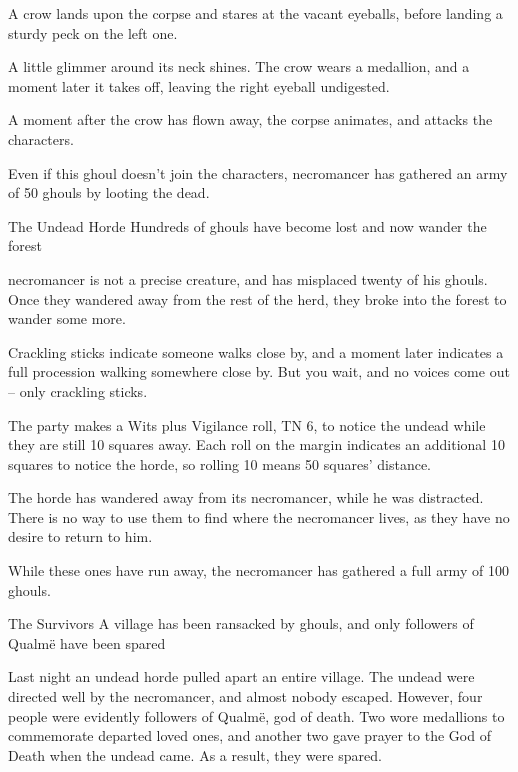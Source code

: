 \begin{multicols}{2}
\begin{boxtext}
	A crow lands upon the corpse and stares at the vacant eyeballs, before landing a sturdy peck on the left one.

	A little glimmer around its neck shines.  The crow wears a medallion, and a moment later it takes off, leaving the right eyeball undigested.

\end{boxtext}

A moment after the crow has flown away, the corpse animates, and attacks the characters.


Even if this ghoul doesn't join the characters, \gls{necromancer} has gathered an army of 50 ghouls by looting the dead.

{The Undead Horde}%
{Hundreds of ghouls have become lost and now wander the forest}%

\Gls{necromancer} is not a precise creature, and has misplaced twenty of his ghouls.
Once they wandered away from the rest of the herd, they broke into the forest to wander some more.

\begin{boxtext}

	Crackling sticks indicate someone walks close by, and a moment later indicates a full procession walking somewhere close by.
	But you wait, and no voices come out -- only crackling sticks.

\end{boxtext}

The party makes a Wits plus Vigilance roll, TN 6, to notice the undead while they are still 10 squares away.
Each roll on the margin indicates an additional 10 squares to notice the horde, so rolling 10 means 50 squares' distance.

The horde has wandered away from its necromancer, while he was distracted.
There is no way to use them to find where the necromancer lives, as they have no desire to return to him.

While these ones have run away, the necromancer has gathered a full army of 100 ghouls.

{The Survivors}%
{A village has been ransacked by ghouls, and only followers of Qualm\"{e} have been spared}%

Last night an undead horde pulled apart an entire village.  The undead were directed well by the necromancer, and almost nobody escaped.
However, four people were evidently followers of Qualm\"{e}, god of death.
Two wore medallions to commemorate departed loved ones, and another two gave prayer to the God of Death when the undead came.
As a result, they were spared.


\end{multicols}
